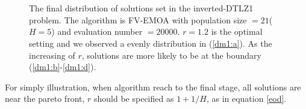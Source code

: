 \documentclass[conference]{IEEEtran}
\begin{document}
\begin{figure}[!t]
  \centering
  \quad
  \\
  \quad
  \\
  \caption{The final distribution of solutions set in the inverted-DTLZ1 problem.
  The algorithm is FV-EMOA with population size $=21$($H=5$) and evaluation number $=20000$.
  $r=1.2$ is the optimal setting and we observed a evenly distribution in (\ref{dm1:a}).
  As the increasing of $r$, solutions are more likely to be at the boundary
  (\ref{dm1:b}-\ref{dm1:d}). 
  }
  \label{dm1}
\end{figure}

For simply illustration,
when algorithm reach to the final stage, all solutions are near the pareto front, $r$ should
be specified as $1+1/H$, as in equation \ref{eod}. 

%
% 
\end{document}
